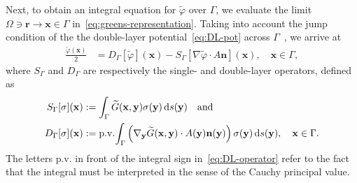 \documentclass[review,hidelinks,onefignum,onetabnum]{siamart220329}
\newcommand{\bn}{\mathbf{n}}
\newcommand{\bx}{\mathbf{x}}
\newcommand{\by}{\mathbf{y}}
\newcommand{\br}{\boldsymbol{r}}
\newcommand{\de}{\,\mathrm{d}}
\newcommand{\tvarphi}{\widetilde \varphi}
\begin{document}
Next, to obtain an integral equation for $\tvarphi$ over $\Gamma$, we evaluate the limit $\Omega \ni \br \to \bx \in \Gamma$ in~\cref{eq:greens-representation}. Taking into account the jump condition of the
the double-layer potential~\eqref{eq:DL-pot} across $\Gamma$~\cite{mclean2000strongly}, we arrive at %
\begin{align}
  \label{eq:greens-formula}
  \frac{\tvarphi(\bx)}{2} &=  D_{\Gamma}[\tvarphi](\bx) - S_{\Gamma}[\nabla \tvarphi \cdot A \bn](\bx), \quad \bx \in \Gamma,
\end{align}
where $S_{\Gamma}$ and $D_{\Gamma}$ are respectively the single- and double-layer operators,
defined as
\begin{subequations}
  \label{eq:calderon-operators}
  \begin{align}
  \label{eq:SL-operator}  
  S_{\Gamma}[\sigma](\bx) &:= \int_\Gamma \widetilde{G}(\bx,\by) \sigma(\by) \de s(\by) \quad\text{and}\\
  \label{eq:DL-operator}  
  D_{\Gamma}[\sigma](\bx) &:= {\rm p.v.}\! \int_\Gamma\left(\nabla_{\by} \widetilde{G}(\bx,\by) \cdot A(\by)\bn(\by) \right)
  \sigma(\by) \de s(\by), \quad \bx \in \Gamma.
\end{align}\label{eq:BIOS}\end{subequations}
The letters p.v. in front of the integral sign in~\cref{eq:DL-operator} refer to the fact that the integral must be interpreted in the sense of the Cauchy principal value.
\end{document}
